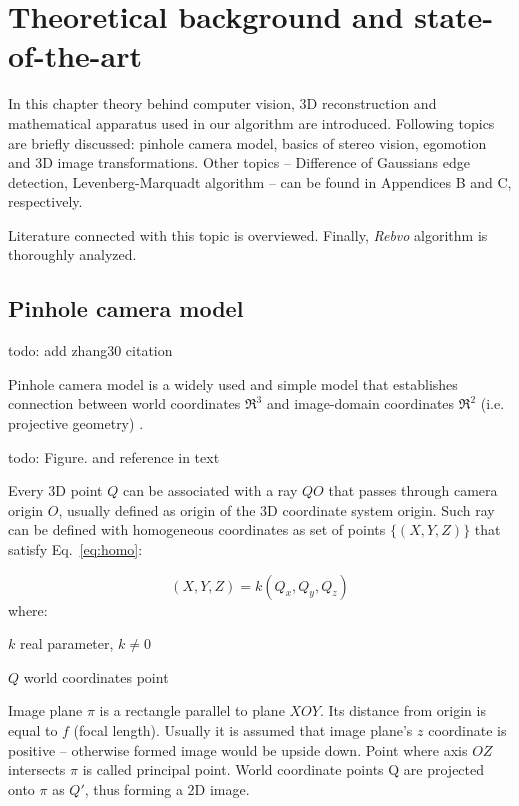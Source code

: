 \chapter{Theoretical background and state-of-the-art}
\label{cha:intro}


In this chapter theory behind computer vision, 3D reconstruction and mathematical apparatus used in our algorithm are introduced. Following topics are briefly discussed: pinhole camera model, basics of stereo vision, egomotion and 3D image transformations. Other topics -- Difference of Gaussians edge detection, Levenberg-Marquadt algorithm -- can be found in Appendices B and C, respectively.

Literature connected with this topic is overviewed. Finally, \textit{Rebvo} algorithm \cite{jose2015realtime} is thoroughly analyzed.


\section{Pinhole camera model}
\label{sec:pinhole}

todo: add zhang30 citation

Pinhole camera model is a widely used and simple model that establishes connection between world coordinates $\Re^3$ and image-domain coordinates $\Re^2$ (i.e. projective geometry) \cite{hartley2003multiple}.

todo: Figure. and reference in text

Every 3D point $Q$ can be associated with a ray $QO$ that passes through camera origin $O$, usually defined as origin of the 3D coordinate system origin. Such ray can be defined with homogeneous coordinates as set of points $\{(X, Y, Z)\}$ that satisfy Eq.~\ref{eq:homo}:

\begin{equation}
(X, Y, Z) = k(Q_x, Q_y, Q_z)
\label{eq:homo}
\end{equation}
where:
\begin{eqwhere}[2cm]
	\item[$k$] real parameter, \(k \neq 0\)
	\item[$Q$] world coordinates point
\end{eqwhere}

Image plane \(\pi\) is a rectangle parallel to plane \(XOY\). Its distance from origin is equal to \(f\) (focal length). Usually it is assumed that image plane's \(z\) coordinate is positive -- otherwise formed image would be upside down. Point where axis \(OZ\) intersects \(\pi\) is called principal point. World coordinate points Q are projected onto \(\pi\) as \(Q'\), thus forming a 2D image.

